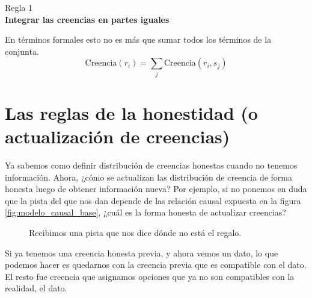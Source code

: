 \documentclass[a4paper,10pt]{book}
\begin{document}
\begin{framed} \centering
Regla 1 \\
\textbf{Integrar las creencias en partes iguales}
\end{framed}

En términos formales esto no es más que sumar todos los términos de la conjunta.
\begin{equation*}
\text{Creencia}(r_i) = \sum_j \text{Creencia}(r_i, s_j) 
\end{equation*}


\section{Las reglas de la honestidad (o actualización de creencias)}

Ya sabemos como definir distribución de creencias honestas cuando no tenemos información.
Ahora, ¿cómo se actualizan las distribución de creencia de forma honesta luego de obtener información nueva?
Por ejemplo, si no ponemos en duda que la pista del que nos dan depende de las relación causal expuesta en la figura \ref{fig:modelo_causal_base}, ¿cuál es la forma honesta de actualizar creencias?

\begin{figure}[H]
\centering
 \caption{Recibimos una pista que nos dice dónde no está el regalo.}
 \label{fig:pista_no_regalo}
\end{figure}

Si ya tenemos una creencia honesta previa, y ahora vemos un dato, lo que podemos hacer es quedarnos con la creencia previa que es compatible con el dato.
El resto fue creencia que asignamos opciones que ya no son compatibles con la realidad, el dato. 
\end{document}
